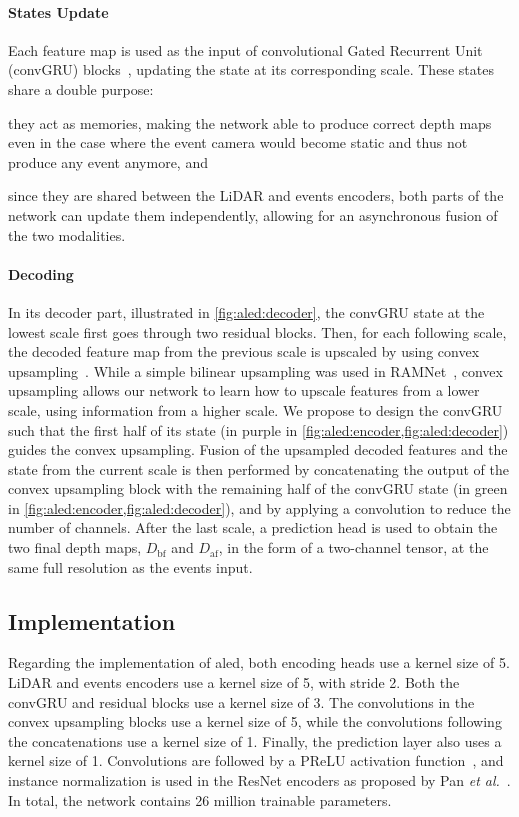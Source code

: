 \paragraph{States Update}
Each feature map is used as the input of convolutional Gated Recurrent Unit (convGRU) blocks~\cite{Siam2017ConvolutionalGR}, updating the state at its corresponding scale. These states share a double purpose:
\begin{enumerate*}[label=\textbf{(\arabic*)}]
  \item they act as memories, making the network able to produce correct depth maps even in the case where the event camera would become static and thus not produce any event anymore, and
  \item since they are shared between the LiDAR and events encoders, both parts of the network can update them independently, allowing for an asynchronous fusion of the two modalities.
\end{enumerate*}

\paragraph{Decoding}
In its decoder part, illustrated in \cref{fig:aled:decoder}, the convGRU state at the lowest scale first goes through two residual blocks. Then, for each following scale, the decoded feature map from the previous scale is upscaled by using convex upsampling~\cite{Teed2020RAFTRA}. While a simple bilinear upsampling was used in RAMNet~\cite{Gehrig2021CombiningEA}, convex upsampling allows our network to learn how to upscale features from a lower scale, using information from a higher scale. We propose to design the convGRU such that the first half of its state (in purple in \cref{fig:aled:encoder,fig:aled:decoder}) guides the convex upsampling. Fusion of the upsampled decoded features and the state from the current scale is then performed by concatenating the output of the convex upsampling block with the remaining half of the convGRU state (in green in \cref{fig:aled:encoder,fig:aled:decoder}), and by applying a convolution to reduce the number of channels. After the last scale, a prediction head is used to obtain the two final depth maps, \(D_\text{bf}\) and \(D_\text{af}\), in the form of a two-channel tensor, at the same full resolution as the events input.

\subsection{Implementation}
Regarding the implementation of \acrshort{aled}, both encoding heads use a kernel size of 5. LiDAR and events encoders use a kernel size of 5, with stride 2. Both the convGRU and residual blocks use a kernel size of 3. The convolutions in the convex upsampling blocks use a kernel size of 5, while the convolutions following the concatenations use a kernel size of 1. Finally, the prediction layer also uses a kernel size of 1. Convolutions are followed by a PReLU activation function~\cite{He2015DelvingDI}, and instance normalization is used in the ResNet encoders as proposed by Pan \textit{et al.}~\cite{Pan2018TwoAO}. In total, the network contains 26 million trainable parameters.

